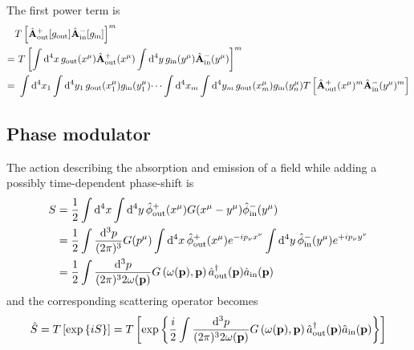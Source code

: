 The first power term is
\begin{equation*}
	\begin{split}
		&
		T\left[
			\hat{\vb{A}}_\text{out}^+[g_\text{out}]
			\hat{\vb{A}}_\text{in}^-[g_\text{in}]
		\right]^m
		\\
		=&\
		T\left[
			\int\dd[4]{x}
			g_\text{out}(x^\mu)
			\hat{\vb{A}}_\text{out}^+(x^\mu)
			\int\dd[4]{y}
			g_\text{in}(y^\mu)
			\hat{\vb{A}}_\text{in}^-(y^\mu)
		\right]^m
		\\
		=&\
		\int\dd[4]{x_1}
		\int\dd[4]{y_1}
		g_\text{out}(x^\mu_1)
		g_\text{in}(y^\mu_1)
		\dots
		\int\dd[4]{x_m}
		\int\dd[4]{y_m}
		g_\text{out}(x^\mu_m)
		g_\text{in}(y^\mu_n)
		T\left[
			\hat{\vb{A}}_\text{out}^+(x^\mu)^m
			\hat{\vb{A}}_\text{in}^-(y^\mu)^m
		\right]
	\end{split}
\end{equation*}

\subsection{Phase modulator}

The action describing the absorption and emission of a field while adding a possibly time-dependent phase-shift is
\begin{equation*}
	\begin{split}
		S
		&=
		\frac{1}{2}
		\int\dd[4]{x}
		\int\dd[4]{y}
		\hat\phi_\text{out}^+(x^\mu)
		G(x^\mu-y^\mu)
		\hat\phi_\text{in}^-(y^\mu)
		\\
		&=
		\frac{1}{2}
		\int\frac{\dd[3]{p}}{(2\pi)^3}
		G(p^\mu)
		\int\dd[4]{x}
		\hat\phi_\text{out}^+(x^\mu)
		e^{-ip_\nu x^\nu}
		\int\dd[4]{y}
		\hat\phi_\text{in}^-(y^\mu)
		e^{+ip_\nu y^\nu}
		\\
		&=
		\frac{1}{2}
		\int\frac{\dd[3]{p}}{(2\pi)^32\omega(\vb{p})}
		G\left(\omega(\vb{p}),\vb{p}\right)
		\hat{a}_\text{out}^\dagger(\vb{p})
		\hat{a}_\text{in}(\vb{p})
	\end{split}
\end{equation*}
and the corresponding scattering operator becomes
\begin{equation*}
	\hat{S}
	=
	T\left[
		\exp\left\{
			iS
		\right\}
	\right]
	=
	T\left[
		\exp\left\{
			\frac{i}{2}
			\int\frac{\dd[3]{p}}{(2\pi)^32\omega(\vb{p})}
			G\left(\omega(\vb{p}),\vb{p}\right)
			\hat{a}_\text{out}^\dagger(\vb{p})
			\hat{a}_\text{in}(\vb{p})
		\right\}
	\right]
\end{equation*}